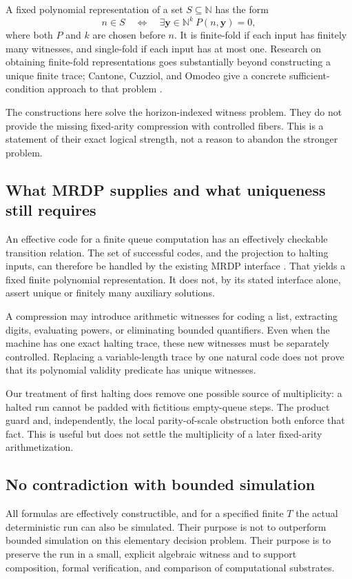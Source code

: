 \documentclass[11pt,a4paper]{article}
\theoremstyle{definition}
\theoremstyle{remark}
\newcommand{\N}{\mathbb N}
\begin{document}
A fixed polynomial representation of a set $S\subseteq\N$ has the form
\[
 n\in S\quad\Longleftrightarrow\quad
 \exists\mathbf y\in\N^k\ P(n,\mathbf y)=0,
\]
where both $P$ and $k$ are chosen before $n$. It is finite-fold if each input has finitely many witnesses, and single-fold if each input has at most one. Research on obtaining finite-fold representations goes substantially beyond constructing a unique finite trace; Cantone, Cuzziol, and Omodeo give a concrete sufficient-condition approach to that problem \cite{cco-six}.

The constructions here solve the horizon-indexed witness problem. They do not provide the missing fixed-arity compression with controlled fibers. This is a statement of their exact logical strength, not a reason to abandon the stronger problem.

\subsection{What MRDP supplies and what uniqueness still requires}
An effective code for a finite queue computation has an effectively checkable transition relation. The set of successful codes, and the projection to halting inputs, can therefore be handled by the existing MRDP interface \cite{repo-mrdp}. That yields a fixed finite polynomial representation. It does not, by its stated interface alone, assert unique or finitely many auxiliary solutions.

A compression may introduce arithmetic witnesses for coding a list, extracting digits, evaluating powers, or eliminating bounded quantifiers. Even when the machine has one exact halting trace, these new witnesses must be separately controlled. Replacing a variable-length trace by one natural code does not prove that its polynomial validity predicate has unique witnesses.

Our treatment of first halting does remove one possible source of multiplicity: a halted run cannot be padded with fictitious empty-queue steps. The product guard and, independently, the local parity-of-scale obstruction both enforce that fact. This is useful but does not settle the multiplicity of a later fixed-arity arithmetization.

\subsection{No contradiction with bounded simulation}
All formulas are effectively constructible, and for a specified finite $T$ the actual deterministic run can also be simulated. Their purpose is not to outperform bounded simulation on this elementary decision problem. Their purpose is to preserve the run in a small, explicit algebraic witness and to support composition, formal verification, and comparison of computational substrates.
\end{document}
